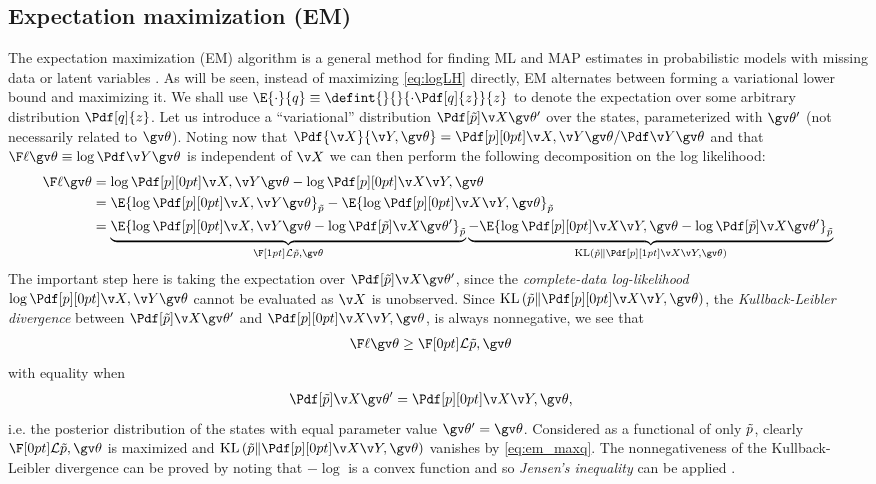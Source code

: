 \subsection{Expectation maximization (EM)}%

The expectation maximization (EM) algorithm \parencite{Dempster1977} is a general
method for finding ML and MAP estimates in probabilistic models with missing data or
latent variables \parencite{Bishop2006,barber2012bayesian}. As will be seen, instead of maximizing
\eqref{eq:logLH} directly, EM alternates between forming a variational lower bound and maximizing it.
We shall use $\E{\cdot}{q}\equiv\defint{}{}{\cdot \Pdf[q]{z}}{z}$ to denote the expectation
over some arbitrary distribution $\Pdf[q]{z}$.
Let us introduce a ``variational'' 
distribution $\tPX$ over the states, parameterized with $\Th'$ (not necessarily related to $\Th$).
Noting now that $\Pdf{\X}{\Y,\Th}=\cLH/\LH$ and that $\lLH\equiv\log\LH$ is independent of $\X$ we can then perform the
following decomposition on the log likelihood:
\begin{align}
	\lLH &= \log\cLH - \log\post \nonumber\\
	&= \E{\log\cLH}_{\tP} - \E{\log\post}_{\tP} \nonumber\\
	&= \underbrace{\E{\log\cLH-\log\tPX}_{\tP}}_{\LB[1pt]{\tP,\Th}}
	\underbrace{-\E{\log\post-\log\tPX}_{\tP}}_{\KL{\tP}{\post[1pt]}}
	\label{eq:lLH_decomp}
\end{align}
The important step here is taking the expectation over $\tPX$, since the \emph{complete-data log-likelihood}
$\log\cLH$ cannot be evaluated as $\X$ is unobserved.
Since $\KL{\tP}{\post}$, the \emph{Kullback-Leibler divergence} between $\tPX$ and $\post$, is always nonnegative,
we see that 
\begin{align}
	\lLH&\geq \LB{\tP,\Th} \label{eq:em_lh_lb}
\end{align}
with equality when 
\begin{align}
	\tPX &= \post, \label{eq:em_maxq}
\end{align}
i.e. the posterior distribution of the states with equal parameter value $\Th'=\Th$. Considered as a functional
of only $\tilde{p}$, clearly $\LB{\tP,\Th}$ is maximized
and $\KL{\tP}{\post}$ vanishes by \eqref{eq:em_maxq}. 
The nonnegativeness of the Kullback-Leibler divergence can be proved by
noting that $-\log$ is a convex function and so \emph{Jensen's inequality}
can be applied \parencite{Bishop2006}.

